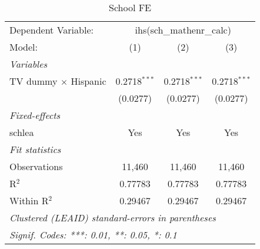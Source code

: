 \begin{table}[htbp]
\centering
\caption{School FE}
\begin{tabular}{lccc}
\tabularnewline\midrule\midrule
Dependent Variable:&\multicolumn{3}{c}{ihs(sch\_mathenr\_calc)}\\
Model:&(1) & (2) & (3)\\
\midrule \emph{Variables}&   &   &  \\
TV dummy $\times$ Hispanic & 0.2718$^{***}$ & 0.2718$^{***}$ & 0.2718$^{***}$\\
  &(0.0277) & (0.0277) & (0.0277)\\
\midrule \emph{Fixed-effects}&   &   &  \\
schlea & Yes & Yes & Yes\\
\midrule \emph{Fit statistics}&  & & \\
Observations & 11,460&11,460&11,460\\
R$^2$ & 0.77783&0.77783&0.77783\\
Within R$^2$ & 0.29467&0.29467&0.29467\\
\midrule\midrule\multicolumn{4}{l}{\emph{Clustered (LEAID) standard-errors in parentheses}}\\
\multicolumn{4}{l}{\emph{Signif. Codes: ***: 0.01, **: 0.05, *: 0.1}}\\
\end{tabular}
\end{table}

